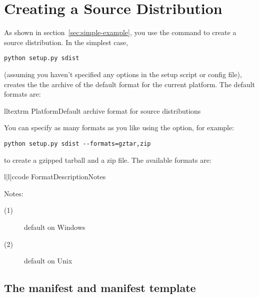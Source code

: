 \documentclass{howto}
\begin{document}


\section{Creating a Source Distribution}
\label{sec:source-dist}

As shown in section~\ref{sec:simple-example}, you use the
 command to create a source distribution.  In the
simplest case,
\begin{verbatim}
python setup.py sdist
\end{verbatim}
(assuming you haven't specified any  options in the setup 
script or config file),  creates the the archive of the
default format for the current platform.  The default formats are:
\begin{tableii}{ll}{textrm}%
  {Platform}{Default archive format for source distributions}
\end{tableii}
You can specify as many formats as you like using the  
option, for example:
\begin{verbatim}
python setup.py sdist --formats=gztar,zip
\end{verbatim}
to create a gzipped tarball and a zip file.  The available formats are:
\begin{tableiii}{l|l|c}{code}%
  {Format}{Description}{Notes}
\end{tableiii}

\noindent Notes:
\begin{description}
\item[(1)] default on Windows
\item[(2)] default on Unix
\end{description}


\subsection{The manifest and manifest template}
\label{sec:manifest}
\end{document}
